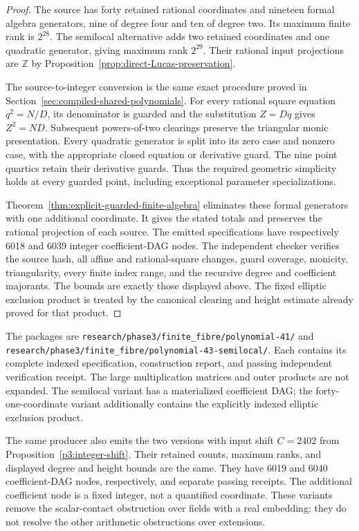 \begin{proof}
The source has forty retained rational coordinates and nineteen
formal algebra generators, nine of degree four and ten of degree
two. Its maximum finite rank is $2^{28}$. The semilocal alternative
adds two retained coordinates and one quadratic generator, giving
maximum rank $2^{29}$. Their rational input projections are
$\mathbb Z$ by Proposition~\ref{prop:direct-Lucas-preservation}.

The source-to-integer conversion is the same exact procedure proved
in Section~\ref{sec:compiled-shared-polynomials}. For every rational
square equation $q^2=N/D$, its denominator is guarded and the
substitution $Z=Dq$ gives $Z^2=ND$. Subsequent powers-of-two
clearings preserve the triangular monic presentation. Every
quadratic generator is split into its zero case and nonzero case,
with the appropriate closed equation or derivative guard. The nine
point quartics retain their derivative guards. Thus the required
geometric simplicity holds at every guarded point, including
exceptional parameter specializations.

Theorem~\ref{thm:explicit-guarded-finite-algebra} eliminates these
formal generators with one additional coordinate. It gives the
stated totals and preserves the rational projection of each source.
The emitted specifications have respectively 6018 and 6039 integer
coefficient-DAG nodes. The independent checker verifies the source
hash, all affine and rational-square changes, guard coverage, monicity,
triangularity, every finite index range, and the recursive degree and
coefficient majorants. The bounds are exactly those displayed above.
The fixed elliptic exclusion product is treated by the canonical
clearing and height estimate already proved for that product.
\end{proof}

The packages are
\nolinkurl{research/phase3/finite_fibre/polynomial-41/} and
\nolinkurl{research/phase3/finite_fibre/polynomial-43-semilocal/}.
Each contains its complete indexed specification, construction
report, and passing independent verification receipt. The large
multiplication matrices and outer products are not expanded.
The semilocal variant has a materialized coefficient DAG; the
forty-one-coordinate variant additionally contains the explicitly
indexed elliptic exclusion product.

The same producer also emits the two versions with input shift
$C=2402$ from Proposition~\ref{p3:integer-shift}. Their retained
counts, maximum ranks, and displayed degree and height bounds
are the same. They have 6019 and 6040 coefficient-DAG nodes,
respectively, and separate passing receipts. The additional
coefficient node is a fixed integer, not a quantified coordinate.
These variants remove the scalar-contact obstruction over fields
with a real embedding; they do not resolve the other arithmetic
obstructions over extensions.

